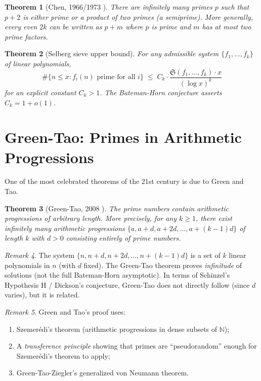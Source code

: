 \documentclass[12pt,a4paper]{amsart}
\newtheorem{theorem}{Theorem}[section]
\theoremstyle{definition}
\theoremstyle{remark}
\newtheorem{remark}[theorem]{Remark}
\newcommand{\N}{\mathbb{N}}
\newcommand{\BH}{\mathfrak{S}}
\begin{document}
\begin{theorem}[Chen, 1966/1973 \cite{Chen1973}]
  There are infinitely many primes $p$ such that $p+2$ is either prime or a product of
  two primes (a \emph{semiprime}).
  More generally, every even $2k$ can be written as $p + m$ where $p$ is prime and
  $m$ has at most two prime factors.
\end{theorem}

\begin{theorem}[Selberg sieve upper bound]
  For any admissible system $\{f_1,\ldots,f_k\}$ of linear polynomials,
  \[
    \#\{n \leq x : f_i(n) \text{ prime for all } i\} \;\leq\;
    C_k \cdot \frac{\BH(f_1,\ldots,f_k) \cdot x}{(\log x)^k}
  \]
  for an explicit constant $C_k > 1$. The Bateman-Horn conjecture asserts $C_k = 1 + o(1)$.
\end{theorem}

\section{Green-Tao: Primes in Arithmetic Progressions}\label{sec:green_tao}

One of the most celebrated theorems of the 21st century is due to Green and Tao.

\begin{theorem}[Green-Tao, 2008 \cite{GT2008}]\label{thm:green_tao}
  The prime numbers contain arithmetic progressions of arbitrary length.
  More precisely, for any $k \geq 1$, there exist infinitely many arithmetic
  progressions $\{a, a+d, a+2d, \ldots, a+(k-1)d\}$ of length $k$ with $d > 0$
  consisting entirely of prime numbers.
\end{theorem}

\begin{remark}
  The system $\{n, n+d, n+2d, \ldots, n+(k-1)d\}$ is a set of $k$ linear polynomials
  in $n$ (with $d$ fixed). The Green-Tao theorem proves \emph{infinitude} of solutions
  (not the full Bateman-Horn asymptotic). In terms of Schinzel's Hypothesis H / Dickson's
  conjecture, Green-Tao does not directly follow (since $d$ varies), but it is related.
\end{remark}

\begin{remark}
  Green and Tao's proof uses:
  \begin{enumerate}[label=(\roman*)]
    \item Szemerédi's theorem (arithmetic progressions in dense subsets of $\N$);
    \item A \emph{transference principle} showing that primes are ``pseudorandom'' enough
      for Szemerédi's theorem to apply;
    \item Green-Tao-Ziegler's generalized von Neumann theorem.
  \end{enumerate}
\end{remark}
\end{document}
